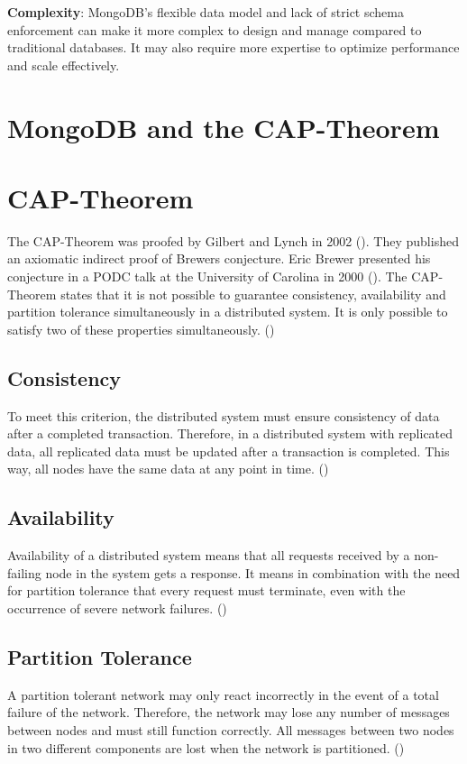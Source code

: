 \textbf{Complexity}: MongoDB's flexible data model and lack of strict schema enforcement can make it more complex to design and manage compared to traditional databases. It may also require more expertise to optimize performance and scale effectively.

\pagebreak
\section{MongoDB and the CAP-Theorem}
\section*{CAP-Theorem}
The \acs{CAP}-Theorem was proofed by Gilbert and Lynch in 2002 (\cite{brewer:2002}). They published an axiomatic indirect proof of Brewers conjecture. Eric Brewer presented his conjecture in a \acs{PODC} talk at the University of Carolina in 2000 (\cite{brewer:2000}). The \acs{CAP}-Theorem states that it is not possible to guarantee consistency, availability and partition tolerance simultaneously in a distributed system. It is only possible to satisfy two of these properties simultaneously. (\cite[p.~1]{brewer:2002})
\subsection*{Consistency}
To meet this criterion, the distributed system must ensure consistency of data after a completed transaction. Therefore, in a distributed system with replicated data, all replicated data must be updated after a transaction is completed. This way, all nodes have the same data at any point in time. (\cite[p.~2ff.]{brewer:2002})
\subsection*{Availability}
Availability of a distributed system means that all requests received by a non-failing node in the system gets a response. It means in combination with the need for partition tolerance that every request must terminate, even with the occurrence of severe network failures. (\cite[p.~3]{brewer:2002})
\subsection*{Partition Tolerance}
A partition tolerant network may only react incorrectly in the event of a total failure of the network. Therefore, the network may lose any number of messages between nodes and must still function correctly. All messages between two nodes in two different components are lost when the network is partitioned. (\cite[p.~3ff.]{brewer:2002})
\pagebreak
